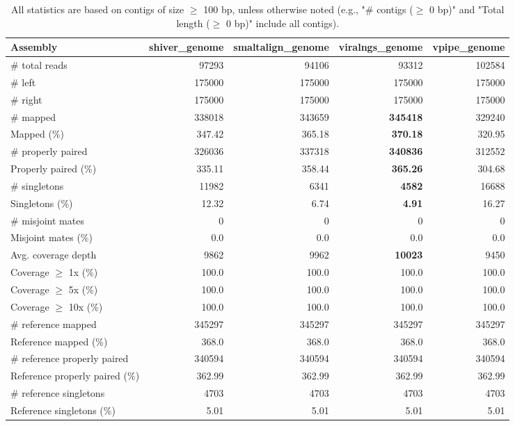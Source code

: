 \documentclass[12pt,a4paper]{article}
\begin{document}
\begin{table}[ht]
\begin{center}
\caption{All statistics are based on contigs of size $\geq$ 100 bp, unless otherwise noted (e.g., "\# contigs ($\geq$ 0 bp)" and "Total length ($\geq$ 0 bp)" include all contigs).}
\begin{tabular}{|l*{4}{|r}|}
\hline
Assembly & shiver\_genome & smaltalign\_genome & viralngs\_genome & vpipe\_genome \\ \hline
\# total reads & 97293 & 94106 & 93312 & 102584 \\ \hline
\# left & 175000 & 175000 & 175000 & 175000 \\ \hline
\# right & 175000 & 175000 & 175000 & 175000 \\ \hline
\# mapped & 338018 & 343659 & {\bf 345418} & 329240 \\ \hline
Mapped (\%) & 347.42 & 365.18 & {\bf 370.18} & 320.95 \\ \hline
\# properly paired & 326036 & 337318 & {\bf 340836} & 312552 \\ \hline
Properly paired (\%) & 335.11 & 358.44 & {\bf 365.26} & 304.68 \\ \hline
\# singletons & 11982 & 6341 & {\bf 4582} & 16688 \\ \hline
Singletons (\%) & 12.32 & 6.74 & {\bf 4.91} & 16.27 \\ \hline
\# misjoint mates & 0 & 0 & 0 & 0 \\ \hline
Misjoint mates (\%) & 0.0 & 0.0 & 0.0 & 0.0 \\ \hline
Avg. coverage depth & 9862 & 9962 & {\bf 10023} & 9450 \\ \hline
Coverage $\geq$ 1x (\%) & 100.0 & 100.0 & 100.0 & 100.0 \\ \hline
Coverage $\geq$ 5x (\%) & 100.0 & 100.0 & 100.0 & 100.0 \\ \hline
Coverage $\geq$ 10x (\%) & 100.0 & 100.0 & 100.0 & 100.0 \\ \hline
\# reference mapped & 345297 & 345297 & 345297 & 345297 \\ \hline
Reference mapped (\%) & 368.0 & 368.0 & 368.0 & 368.0 \\ \hline
\# reference properly paired & 340594 & 340594 & 340594 & 340594 \\ \hline
Reference properly paired (\%) & 362.99 & 362.99 & 362.99 & 362.99 \\ \hline
\# reference singletons & 4703 & 4703 & 4703 & 4703 \\ \hline
Reference singletons (\%) & 5.01 & 5.01 & 5.01 & 5.01 \\ \hline

\end{tabular}
\end{center}
\end{table}
\end{document}
